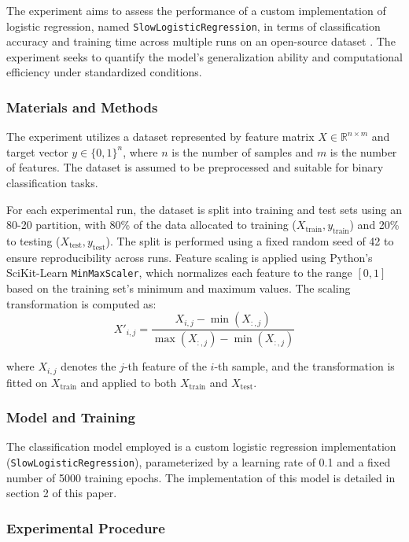 \documentclass{article}
\theoremstyle{plain}
\theoremstyle{definition}
\theoremstyle{remark}
\begin{document}
The experiment aims to assess the performance of a custom implementation of logistic regression, named \texttt{SlowLogisticRegression}, in terms of classification accuracy and training time across multiple runs on an open-source dataset \cite{breastcancer}. The experiment seeks to quantify the model's generalization ability and computational efficiency under standardized conditions.


\subsubsection{Materials and Methods}

The experiment utilizes a dataset represented by feature matrix $ X \in \mathbb{R}^{n \times m} $ and target vector $ y \in \{0, 1\}^n $, where $ n $ is the number of samples and $ m $ is the number of features. The dataset is assumed to be preprocessed and suitable for binary classification tasks.

For each experimental run, the dataset is split into training and test sets using an 80-20 partition, with 80\% of the data allocated to training ($ X_{\text{train}}, y_{\text{train}} $) and 20\% to testing ($ X_{\text{test}}, y_{\text{test}} $). The split is performed using a fixed random seed of 42 to ensure reproducibility across runs. Feature scaling is applied using Python's SciKit-Learn \texttt{MinMaxScaler}, which normalizes each feature to the range $[0, 1]$ based on the training set's minimum and maximum values. The scaling transformation is computed as:
$$
X'_{i,j} = \frac{X_{i,j} - \min(X_{:,j})}{\max(X_{:,j}) - \min(X_{:,j})}
$$

where $ X_{i,j} $ denotes the $ j $-th feature of the $ i $-th sample, and the transformation is fitted on $ X_{\text{train}} $ and applied to both $ X_{\text{train}} $ and $ X_{\text{test}} $.


\subsubsection{Model and Training}

The classification model employed is a custom logistic regression implementation (\texttt{SlowLogisticRegression}), parameterized by a learning rate of 0.1 and a fixed number of 5000 training epochs. The implementation of this model is detailed in section 2 of this paper.


\subsubsection{Experimental Procedure}
\end{document}
